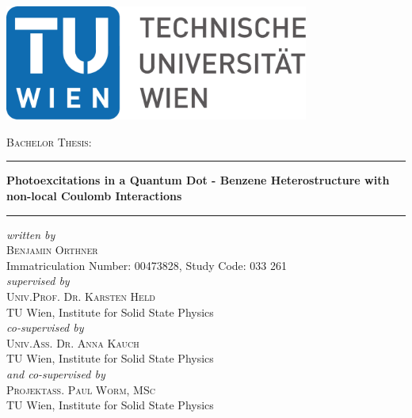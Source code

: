 \documentclass[hidelinks,oneside]{scrbook}			%
\begin{document}
\begin{titlepage}
\begin{center}
    \vspace*{15mm}
    \includegraphics[width=100mm]{./graph/TU_Logo.pdf}
    
    \vspace{20mm}
    
    {\Large \textsc{Bachelor Thesis:}}
    
    \vspace{7mm}
    
    \rule{\textwidth}{0.4pt}\vspace{5mm}
    {\LARGE \textbf{Photoexcitations in a Quantum Dot - Benzene Heterostructure with non-local Coulomb Interactions}} \\[3mm]
    \rule{\textwidth}{0.4pt}
    
    \vspace{15mm}
    \emph{written by}\\
    {\Large \textsc{Benjamin Orthner}}\\
    Immatriculation Number: 00473828, Study Code: 033 261\\
    
    \vspace{15mm}
    \emph{supervised by}\\
    {\Large \textsc{Univ.Prof. Dr. Karsten Held}}\\
    TU Wien, Institute for Solid State Physics\\
    
    \vspace{10mm}
    \emph{co-supervised by}\\
    {\Large \textsc{Univ.Ass. Dr. Anna Kauch}}\\
    TU Wien, Institute for Solid State Physics\\
    
    \vspace{10mm}
    \emph{and co-supervised by}\\
    {\Large \textsc{Projektass. Paul Worm, MSc}}\\
    TU Wien, Institute for Solid State Physics\\
    
\end{center}

  \date{\today}
\vspace{\fill}
\begin{flushright} %
\makeatletter
\@date
\makeatother
\end{flushright}
\end{titlepage}
\end{document}
